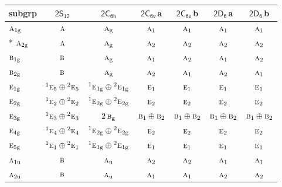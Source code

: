 \documentclass[10pt,a4paper]{article}
\numberwithin{equation}{section}
\newcommand{\grp}[1]{\mathsf{#1}}
\newcommand{\irr}[1]{\text{\normalfont\scshape #1}}
\newcommand{\conjpair}[1]{{}^{#1}}
\newcommand{\ptag}[1]{\mathrm{#1}}
\newcommand{\clsletter}[1]{\,{\scriptsize\color{black!55}#1}}
\begin{document}
{\small\begin{longtable}{@{}lcccccc@{}}\toprule
subgrp & \href{2S12.pdf}{$\grp{2S_{12}}$} & \href{2C6h.pdf}{$\grp{2C_{6h}}$} & \href{2C6v.pdf}{$\grp{2C_{6v}}$}\clsletter{a} & \href{2C6v.pdf}{$\grp{2C_{6v}}$}\clsletter{b} & \href{2D6.pdf}{$\grp{2D_{6}}$}\clsletter{a} & \href{2D6.pdf}{$\grp{2D_{6}}$}\clsletter{b}\\\midrule\endhead
\bottomrule\endfoot\endlastfoot
$\irr{a}_{1\ptag{g}}$ & $\irr{a}$ & $\irr{a}_{\ptag{g}}$ & $\irr{a}_{1}$ & $\irr{a}_{1}$ & $\irr{a}_{1}$ & $\irr{a}_{1}$\\*
$\irr{a}_{2\ptag{g}}$ & $\irr{a}$ & $\irr{a}_{\ptag{g}}$ & $\irr{a}_{2}$ & $\irr{a}_{2}$ & $\irr{a}_{2}$ & $\irr{a}_{2}$\\
$\irr{b}_{1\ptag{g}}$ & $\irr{b}$ & $\irr{a}_{\ptag{g}}$ & $\irr{a}_{1}$ & $\irr{a}_{2}$ & $\irr{a}_{1}$ & $\irr{a}_{2}$\\
$\irr{b}_{2\ptag{g}}$ & $\irr{b}$ & $\irr{a}_{\ptag{g}}$ & $\irr{a}_{2}$ & $\irr{a}_{1}$ & $\irr{a}_{2}$ & $\irr{a}_{1}$\\
$\irr{e}_{1\ptag{g}}$ & $\conjpair{1}\irr{e}_{5}\oplus \conjpair{2}\irr{e}_{5}$ & $\conjpair{1}\irr{e}_{1\ptag{g}}\oplus \conjpair{2}\irr{e}_{1\ptag{g}}$ & $\irr{e}_{1}$ & $\irr{e}_{1}$ & $\irr{e}_{1}$ & $\irr{e}_{1}$\\
$\irr{e}_{2\ptag{g}}$ & $\conjpair{1}\irr{e}_{2}\oplus \conjpair{2}\irr{e}_{2}$ & $\conjpair{1}\irr{e}_{2\ptag{g}}\oplus \conjpair{2}\irr{e}_{2\ptag{g}}$ & $\irr{e}_{2}$ & $\irr{e}_{2}$ & $\irr{e}_{2}$ & $\irr{e}_{2}$\\
$\irr{e}_{3\ptag{g}}$ & $\conjpair{1}\irr{e}_{3}\oplus \conjpair{2}\irr{e}_{3}$ & $2\,\irr{b}_{\ptag{g}}$ & $\irr{b}_{1}\oplus \irr{b}_{2}$ & $\irr{b}_{1}\oplus \irr{b}_{2}$ & $\irr{b}_{1}\oplus \irr{b}_{2}$ & $\irr{b}_{1}\oplus \irr{b}_{2}$\\
$\irr{e}_{4\ptag{g}}$ & $\conjpair{1}\irr{e}_{4}\oplus \conjpair{2}\irr{e}_{4}$ & $\conjpair{1}\irr{e}_{2\ptag{g}}\oplus \conjpair{2}\irr{e}_{2\ptag{g}}$ & $\irr{e}_{2}$ & $\irr{e}_{2}$ & $\irr{e}_{2}$ & $\irr{e}_{2}$\\
$\irr{e}_{5\ptag{g}}$ & $\conjpair{1}\irr{e}_{1}\oplus \conjpair{2}\irr{e}_{1}$ & $\conjpair{1}\irr{e}_{1\ptag{g}}\oplus \conjpair{2}\irr{e}_{1\ptag{g}}$ & $\irr{e}_{1}$ & $\irr{e}_{1}$ & $\irr{e}_{1}$ & $\irr{e}_{1}$\\
$\irr{a}_{1\ptag{u}}$ & $\irr{b}$ & $\irr{a}_{\ptag{u}}$ & $\irr{a}_{2}$ & $\irr{a}_{2}$ & $\irr{a}_{1}$ & $\irr{a}_{1}$\\
$\irr{a}_{2\ptag{u}}$ & $\irr{b}$ & $\irr{a}_{\ptag{u}}$ & $\irr{a}_{1}$ & $\irr{a}_{1}$ & $\irr{a}_{2}$ & $\irr{a}_{2}$\\

\end{longtable}}
\end{document}
